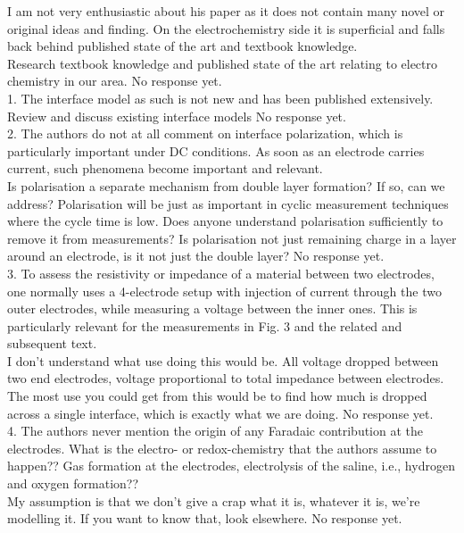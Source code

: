 \documentclass[journal, a4paper]{IEEEtran}
\begin{document}
{\color{blue}
I am not very enthusiastic about his paper as it does not contain many novel or original ideas and finding. On the electrochemistry side it is superficial and falls back behind published state of the art and textbook knowledge.\\
{\color{OliveGreen}
    {\color{Red} Research textbook knowledge and published state of the art relating to electro chemistry in our area.}
    No response yet.
}\\

1. The interface model as such is not new and has been published extensively.\\
{\color{OliveGreen} 
    {\color{Red} Review and discuss existing interface models}
    No response yet.
}\\

2. The authors do not at all comment on interface polarization, which is particularly important under DC conditions. As soon as an electrode carries current, such phenomena become important and relevant.\\
{\color{OliveGreen}
    {\color{Red} Is polarisation a separate mechanism from double layer formation? If so, can we address? Polarisation will be just as important in cyclic measurement techniques where the cycle time is low. Does anyone understand polarisation sufficiently to remove it from measurements? Is polarisation not just remaining charge in a layer around an electrode, is it not just the double layer?}
    No response yet.
}\\

3. To assess the resistivity or impedance of a material between two electrodes, one normally uses a 4-electrode setup with injection of current through the two outer electrodes, while measuring a voltage between the inner ones. This is particularly relevant for the measurements in Fig. 3 and the related and subsequent text.\\
{\color{OliveGreen} 
    {\color{Red} I don't understand what use doing this would be. All voltage dropped between two end electrodes, voltage proportional to total impedance between electrodes. The most use you could get from this would be to find how much is dropped across a single interface, which is exactly what we are doing.}
    No response yet.    
}\\

4. The authors never mention the origin of any Faradaic contribution at the electrodes. What is the electro- or redox-chemistry that the authors assume to happen?? Gas formation at the electrodes, electrolysis of the saline, i.e., hydrogen and oxygen formation??\\
{\color{OliveGreen}
    {\color{Red} My assumption is that we don't give a crap what it is, whatever it is, we're modelling it. If you want to know that, look elsewhere.}
    No response yet.
}\\

}
\end{document}

